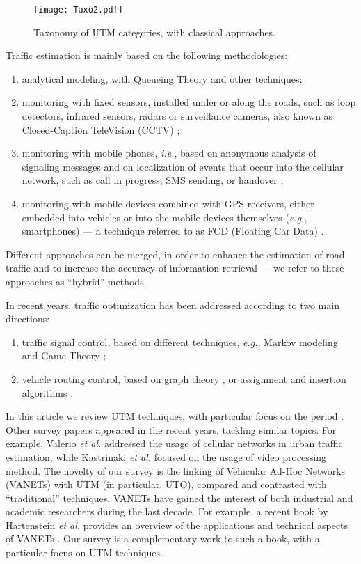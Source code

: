 \documentclass[10pt,onecolumn]{article}
\begin{document}
\begin{figure}[ht]
\centering
\texttt{[image: Taxo2.pdf]}
\caption{Taxonomy of UTM categories, with classical approaches.}
\label{fig:Taxo2}
\end{figure}

Traffic estimation is mainly based on the following methodologies:
\begin{enumerate}
\item analytical modeling, with Queueing Theory \cite{Woensel2006, Osorio2009} and other techniques;
\item monitoring with fixed sensors, installed under or along the roads, such as loop detectors, infrared sensors, radars or surveillance cameras, also known as Closed-Caption TeleVision (CCTV) \cite{Coifman2009};
\item monitoring with mobile phones, \textit{i.e.}, based on anonymous analysis of signaling messages and on localization of events that occur into the cellular network, such as call in progress, SMS sending, or handover \cite{Valerio2009, Calabrese2011};
\item monitoring with mobile devices combined with GPS receivers, either embedded into vehicles or into the mobile devices themselves (\textit{e.g.}, smartphones) --- a technique referred to as FCD (Floating Car Data) \cite{Messelodi2009, Tao2012, Li2009}.
\end{enumerate} 
Different approaches can be merged, in order to enhance the estimation of road traffic and to increase the accuracy of information retrieval --- we refer to these approaches as ``hybrid'' methods.

In recent years, traffic optimization has been addressed according to two main directions:
\begin{enumerate} 
\item traffic signal control, based on different techniques, \textit{e.g.}, Markov modeling \cite{Osorio2009} and Game Theory \cite{Cheng2006};
\item vehicle routing control, based on graph theory \cite{Miller2009} \cite{Scellato2010}, or assignment and insertion algorithms \cite{Fleischmann2004}.
\end{enumerate} 

In this article we review UTM techniques, with particular focus on the period . 
Other survey papers appeared in the recent years, tackling similar topics. For example, Valerio \textit{et al.} \cite{valerio2009exploiting} addressed the usage of cellular networks in urban traffic estimation, while Kastrinaki \textit{et al.} \cite{kastrinaki2003survey} focused on the usage of video processing method.
The novelty of our survey is the linking of Vehicular Ad-Hoc Networks (VANETs) with UTM (in particular, UTO), compared and contrasted with ``traditional'' techniques. 
VANETs have gained the interest of both industrial and academic researchers during the last decade. 
For example, a recent book by Hartenstein \textit{et al.} provides an overview of the applications and technical aspects of VANETs \cite{HartensteinVANTE2009}. Our survey is a complementary work to such a book, with a particular focus on UTM techniques.
\end{document}
